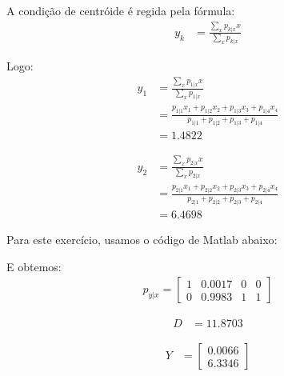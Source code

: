 \documentclass[12pt]{article}
\newenvironment{exercise}[2][Exercício]{\begin{trivlist}
\item[\hskip \labelsep {\bfseries #1}\hskip \labelsep {\bfseries #2.}]}{\end{trivlist}}
\begin{document}
\begin{exercise}{1.d}
A condição de centróide é regida pela fórmula:
\begin{align*}
y_k &= \frac{\sum_x p_{k|x} x}{\sum_x p_{k|x}}
\end{align*}

Logo:
\begin{align*}
y_1 &= \frac{\sum_x p_{1|x} x}{\sum_x p_{1|x}} \\
&= \frac{p_{1|1} x_1 + p_{1|2} x_2 + p_{1|3} x_3 + p_{1|4} x_4}{p_{1|1} +
p_{1|2} + p_{1|3} + p_{1|4}} \\
&= 1.4822
\end{align*}

\begin{align*}
y_2 &= \frac{\sum_x p_{2|x} x}{\sum_x p_{2|x}} \\
&= \frac{p_{2|1} x_1 + p_{2|2} x_2 + p_{2|3} x_3 + p_{2|4} x_4}{p_{2|1} +
p_{2|2} + p_{2|3} + p_{2|4}} \\
&= 6.4698
\end{align*}


\end{exercise}

\begin{exercise}{1.e}
Para este exercício, usamos o código de Matlab abaixo:


E obtemos:
\begin{align*}
p_{y|x} = \begin{bmatrix}
1 & 0.0017 & 0 & 0\\
0 & 0.9983 & 1 & 1
\end{bmatrix}
\end{align*}

\begin{align*}
D &= 11.8703
\end{align*}

\begin{align*}
Y &= \begin{bmatrix}
0.0066 \\ 6.3346
\end{bmatrix}
\end{align*}
\end{exercise}
\end{document}
